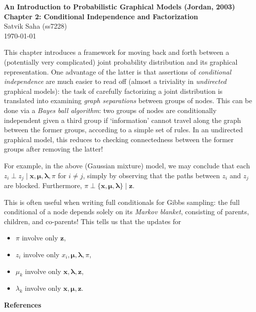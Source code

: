 \documentclass[12pt]{article}
\begin{document}
\begin{flushleft}
\textbf{%
    An Introduction to Probabilistic Graphical Models (Jordan, 2003) \\
    Chapter 2: Conditional Independence and Factorization
} \\
Satvik Saha (ss7228) \\
\today
\end{flushleft}

\vspace{0.1in}

This chapter introduces a framework for moving back and forth between a
(potentially very complicated) joint probability distribution and its graphical
representation.
One advantage of the latter is that assertions of \emph{conditional
independence} are much easier to read off (almost a triviality in
\emph{undirected} graphical models): the task of carefully factorizing a joint
distribution is translated into examining \emph{graph separations} between
groups of nodes.
This can be done via a \emph{Bayes ball algorithm}: two groups of nodes are
conditionally independent given a third group if `information' cannot travel
along the graph between the former groups, according to a simple set of rules.
In an undirected graphical model, this reduces to checking connectedness
between the former groups after removing the latter!

\vspace{1em}
\vspace{1em}

For example, in the above (Gaussian mixture) model, we may conclude that each
$z_i \perp z_j \mid \bm{x}, \bm{\mu}, \bm{\lambda}, \pi$ for $i \neq j$, simply
by observing that the paths between $z_i$ and $z_j$ are blocked.
Furthermore, $\pi \perp \{\bm{x}, \bm{\mu}, \bm{\lambda}\} \mid \bm{z}$.

This is often useful when writing full conditionals for Gibbs sampling: the
full conditional of a node depends solely on its \emph{Markov blanket},
consisting of parents, children, and co-parents!
This tells us that the updates for \vspace{-0.5em}
\begin{itemize}
    \itemsep-0.5em
    \item $\pi$ involve only $\bm{z}$,
    \item $z_i$ involve only $x_i, \bm{\mu}, \bm{\lambda}, \pi$,
    \item $\mu_k$ involve only $\bm{x}, \bm{\lambda}, \bm{z}$,
    \item $\lambda_k$ involve only $\bm{x}, \bm{\mu}, \bm{z}$.
\end{itemize}


\nocite{*}


\vfill

\begingroup
\renewcommand{\section}[2]{}%
\textbf{References}

\endgroup
\end{document}
